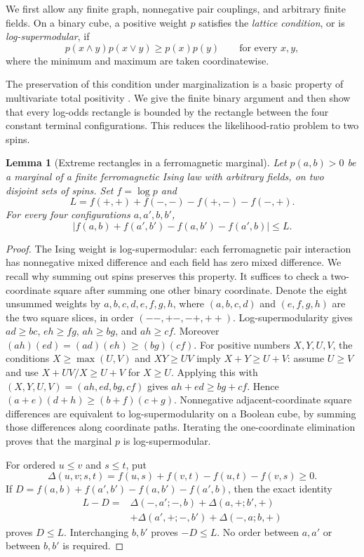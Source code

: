 \documentclass[11pt]{article}
\newtheorem{lemma}[theorem]{Lemma}
\theoremstyle{definition}
\theoremstyle{remark}
\numberwithin{equation}{section}
\begin{document}
We first allow any finite graph, nonnegative pair couplings, and arbitrary
finite fields. On a binary cube, a positive weight $p$ satisfies the
\emph{lattice condition}, or is \emph{log-supermodular}, if
\[
 p(x\wedge y)p(x\vee y)\ge p(x)p(y)
 \qquad\text{for every }x,y,
\]
where the minimum and maximum are taken coordinatewise.

The preservation of this condition under marginalization is a basic
property of multivariate total positivity \cite{KarlinRinott1980}.
We give the finite binary argument and then show that every log-odds
rectangle is bounded by the rectangle between the four constant terminal
configurations. This reduces the likelihood-ratio problem to two spins.

\begin{lemma}[Extreme rectangles in a ferromagnetic marginal]
\label{fd:mtp2}
Let \(p(a,b)>0\) be a marginal of a finite ferromagnetic Ising law with
arbitrary fields, on two disjoint sets of spins.  Set \(f=\log p\) and
\[
 L=f(+,+)+f(-,-)-f(+,-)-f(-,+).
\]
For every four configurations \(a,a',b,b'\),
\begin{equation}
 \left|f(a,b)+f(a',b')-f(a,b')-f(a',b)\right|\le L.
 \label{fd:extreme-rectangle}
\end{equation}
\end{lemma}

\begin{proof}
The Ising weight is log-supermodular: each ferromagnetic pair interaction
has nonnegative mixed difference and each field has zero mixed difference.
We recall why summing out spins preserves this property.  It suffices to
check a two-coordinate square after summing one other binary coordinate.
Denote the eight unsummed weights by
\(a,b,c,d,e,f,g,h\), where \((a,b,c,d)\) and \((e,f,g,h)\)
are the two square slices, in order \((--,+-,-+,++)\).
Log-supermodularity gives
\(ad\ge bc\), \(eh\ge fg\),
\(ah\ge bg\), and \(ah\ge cf\).
Moreover \((ah)(ed)=(ad)(eh)\ge(bg)(cf)\).
For positive numbers \(X,Y,U,V\), the conditions
\(X\ge\max(U,V)\) and \(XY\ge UV\) imply
\(X+Y\ge U+V\): assume \(U\ge V\) and use
\(X+UV/X\ge U+V\) for \(X\ge U\).
Applying this with \((X,Y,U,V)=(ah,ed,bg,cf)\) gives
\(ah+ed\ge bg+cf\).  Hence
\((a+e)(d+h)\ge(b+f)(c+g)\).
Nonnegative adjacent-coordinate square differences are equivalent to
log-supermodularity on a Boolean cube, by summing those differences along
coordinate paths.  Iterating the one-coordinate elimination proves that
the marginal \(p\) is log-supermodular.

For ordered \(u\le v\) and \(s\le t\), put
\[
 \Delta(u,v;s,t)=f(u,s)+f(v,t)-f(u,t)-f(v,s)\ge0.
\]
If \(D=f(a,b)+f(a',b')-f(a,b')-f(a',b)\), then the exact identity
\[
\begin{split}
L-D={}&\Delta(-,a';-,b)+\Delta(a,+;b',+)\\
      &+\Delta(a',+;-,b')+\Delta(-,a;b,+)
\end{split}
\]
proves \(D\le L\).  Interchanging \(b,b'\) proves \(-D\le L\).
No order between \(a,a'\) or between \(b,b'\) is required.
\end{proof}
\end{document}
